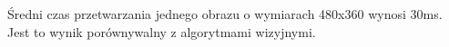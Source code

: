 Średni czas przetwarzania jednego obrazu o wymiarach 480x360 wynosi 30ms. Jest to wynik porównywalny z algorytmami wizyjnymi.


%
%
%
%
%
%
%

